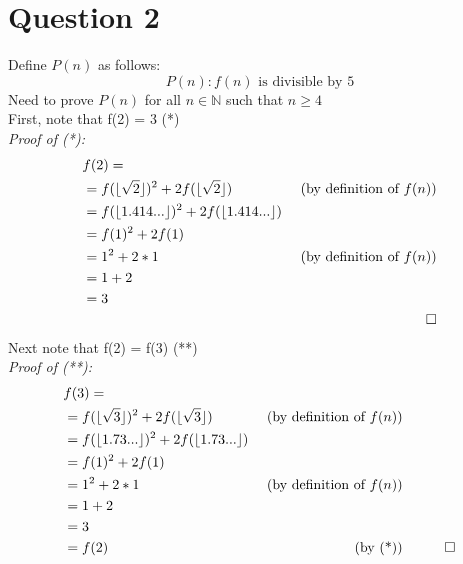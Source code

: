 \documentclass[12pt]{article}
\begin{document}
\section*{Question 2}
Define $P(n)$ as follows:
$$P(n) : \text{$f(n)$ is divisible by $5$}$$
Need to prove $P(n)$ for all $n \in \mathbb{N}$ such that  $n \geq 4$\\
First, note that f(2) = 3 (*)
\\\textit{Proof of (*):}
\begin{align*}
& f(2) =\\
&= f(\lfloor\sqrt{2}\rfloor)^{2} + 2f(\lfloor\sqrt{2}\rfloor) &\text{ (by definition of $f(n)$)}\\
& =f(\lfloor1.414...\rfloor)^{2} + 2f(\lfloor1.414...\rfloor)\\
& =f(1)^{2} + 2f(1)\\
& = 1^2 + 2*1  &\text{(by definition of $f(n)$)}\\
& = 1 + 2\\
& = 3\\
&& \qed
\end{align*}
Next note that f(2) = f(3) (**)
\\\textit{Proof of (**):}
\begin{align*}
& f(3) =\\
&= f(\lfloor\sqrt{3}\rfloor)^{2} + 2f(\lfloor\sqrt{3}\rfloor) &\text{ (by definition of $f(n)$)}\\
& =f(\lfloor1.73...\rfloor)^{2} + 2f(\lfloor1.73...\rfloor)\\
& =f(1)^{2} + 2f(1)\\
& = 1^2 + 2*1  &\text{(by definition of $f(n)$)}\\
& = 1 + 2\\
& = 3\\
& = f(2) &\text{(by (*))}
&& \qed
\end{align*}
\end{document}

